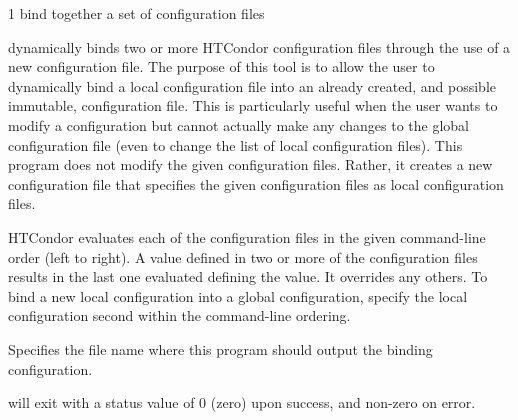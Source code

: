 \begin{ManPage}{\label{man-condor-config-bind}}{1}
{bind together a set of configuration files}


\Synopsis {}


\Description

 dynamically binds two or more HTCondor
configuration files through the use of a new configuration file.  The
purpose of this tool is to allow the user to dynamically bind a local
configuration file into an already created, and possible immutable,
configuration file.  This is particularly useful when the user wants to
modify a configuration but cannot actually make any changes to the
global configuration file (even to change the list of local configuration
files).  This program does not modify the given configuration files.
Rather, it creates a new configuration file that specifies the given
configuration files as local configuration files.  

HTCondor evaluates each of the configuration files in the given
command-line order (left to right).
A value defined 
in two or more of the configuration files results in
the last one evaluated defining the value. It overrides any others.
To bind a new local configuration into a global configuration, 
specify the local configuration second within the command-line
ordering.

\begin{Options}
   {
    Specifies the file name where this program should output the
    binding configuration. 
  }
\end{Options}

\ExitStatus

 will exit with a status value of 0 (zero) upon
success, and non-zero on error.

\end{ManPage}
